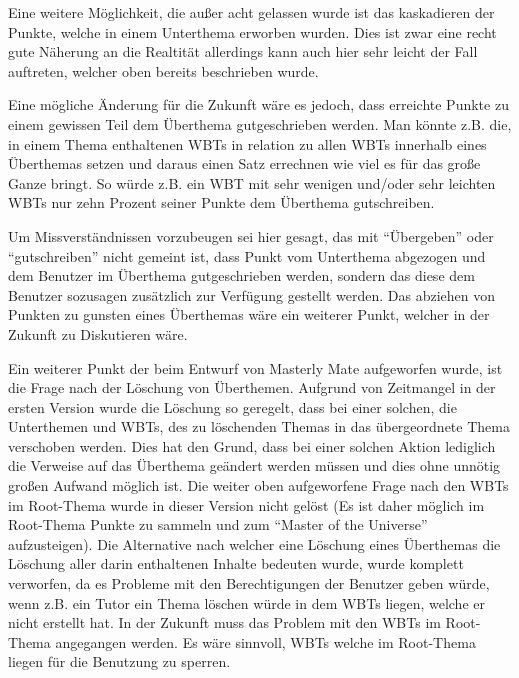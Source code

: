 Eine weitere Möglichkeit, die außer acht gelassen wurde ist das kaskadieren der
Punkte, welche in einem Unterthema erworben wurden. Dies ist zwar eine recht
gute Näherung an die Realtität allerdings kann auch hier sehr leicht der Fall
auftreten, welcher oben bereits beschrieben wurde.

Eine mögliche Änderung für die Zukunft wäre es jedoch, dass erreichte Punkte zu
einem gewissen Teil dem Überthema gutgeschrieben werden. Man könnte z.B.
die, in einem Thema enthaltenen WBTs in relation zu allen WBTs innerhalb eines
Überthemas setzen und daraus einen Satz errechnen wie viel es für das große
Ganze bringt. So würde z.B. ein WBT mit sehr wenigen und/oder sehr leichten WBTs
nur zehn Prozent seiner Punkte dem Überthema gutschreiben.

Um Missverständnissen vorzubeugen sei hier gesagt, das mit "`Übergeben"' oder
"`gutschreiben"' nicht gemeint ist, dass Punkt vom Unterthema abgezogen und dem
Benutzer im Überthema gutgeschrieben werden, sondern das diese dem Benutzer
sozusagen zusätzlich zur Verfügung gestellt werden. Das abziehen von Punkten zu
gunsten eines Überthemas wäre ein weiterer Punkt, welcher in der Zukunft zu
Diskutieren wäre.

Ein weiterer Punkt der beim Entwurf von Masterly Mate aufgeworfen wurde, ist die
Frage nach der Löschung von Überthemen. Aufgrund von Zeitmangel in der ersten
Version wurde die Löschung so geregelt, dass bei einer solchen, die Unterthemen
und WBTs, des zu löschenden Themas in das übergeordnete Thema verschoben werden.
Dies hat den Grund, dass bei einer solchen Aktion lediglich die Verweise auf das
Überthema geändert werden müssen und dies ohne unnötig großen Aufwand möglich
ist. Die weiter oben aufgeworfene Frage nach den WBTs im Root-Thema wurde in
dieser Version nicht gelöst (Es ist daher möglich im Root-Thema Punkte zu
sammeln und zum "`Master of the Universe"' aufzusteigen). Die Alternative nach
welcher eine Löschung eines Überthemas die Löschung aller darin enthaltenen
Inhalte bedeuten wurde, wurde komplett verworfen, da es Probleme mit den
Berechtigungen der Benutzer geben würde, wenn z.B. ein Tutor ein Thema löschen
würde in dem WBTs liegen, welche er nicht erstellt hat. In der Zukunft muss das
Problem mit den WBTs im Root-Thema angegangen werden. Es wäre sinnvoll, WBTs
welche im Root-Thema liegen für die Benutzung zu sperren.